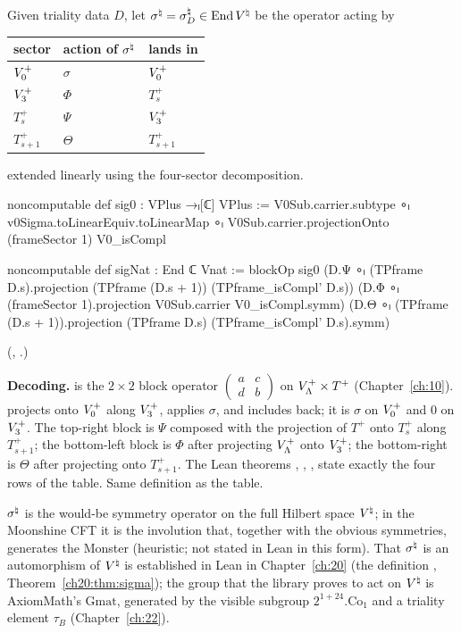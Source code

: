 \begin{definition}\label{ch14:def:signat}
Given triality data $D$, let $\sigma^{\natural}=\sigma^{\natural}_D\in\operatorname{End}{V^{\natural}}$ be the operator acting by
\begin{center}
\begin{tabular}{lll}
\toprule
sector & action of $\sigma^{\natural}$ & lands in \\ \midrule
$V_0^{+}$ & $\sigma$ & $V_0^{+}$\\
$V_3^{+}$ & $\Phi$ & $T_s^+$\\
$T_s^+$ & $\Psi$ & $V_3^{+}$\\
$T_{s+1}^+$ & $\Theta$ & $T_{s+1}^+$\\ \bottomrule
\end{tabular}
\end{center}
extended linearly using the four-sector decomposition.
\end{definition}
\begin{leancode}
noncomputable def sig0 : VPlus →ₗ[ℂ] VPlus :=
  V0Sub.carrier.subtype ∘ₗ v0Sigma.toLinearEquiv.toLinearMap ∘ₗ
    V0Sub.carrier.projectionOnto (frameSector 1) V0_isCompl

noncomputable def sigNat : End ℂ Vnat :=
  blockOp sig0
    (D.Ψ ∘ₗ (TPframe D.s).projection (TPframe (D.s + 1)) (TPframe_isCompl' D.s))
    (D.Φ ∘ₗ (frameSector 1).projection V0Sub.carrier V0_isCompl.symm)
    (D.Θ ∘ₗ (TPframe (D.s + 1)).projection (TPframe D.s) (TPframe_isCompl' D.s).symm)
\end{leancode}
(, .)

\begin{dictionary}
\textbf{Decoding.}   is the $2\times2$ block operator
$\begin{pmatrix}a&c\\d&b\end{pmatrix}$ on $V_{\Lambda}^+\times T^+$ (Chapter~\ref{ch:10}).
 projects onto $V_0^{+}$ along $V_3^{+}$, applies $\sigma$, and includes back; it is $\sigma$ on
$V_0^{+}$ and $0$ on $V_3^{+}$.  The top-right block is $\Psi$ composed with the projection of $T^+$ onto
$T_s^+$ along $T_{s+1}^+$; the bottom-left block is $\Phi$ after projecting $V_{\Lambda}^+$ onto $V_3^{+}$;
the bottom-right is $\Theta$ after projecting onto $T_{s+1}^+$.  The Lean theorems
, , ,  state exactly the four rows of the
table.  Same definition as the table.
\end{dictionary}
\begin{physics}
$\sigma^{\natural}$ is the would-be symmetry operator on the full Hilbert space ${V^{\natural}}$; in the Moonshine CFT it is the involution that, together with the obvious symmetries, generates the Monster (heuristic; not stated in Lean in this form).  That $\sigma^{\natural}$ is an automorphism of ${V^{\natural}}$ is established in Lean in Chapter~\ref{ch:20} (the definition , Theorem~\ref{ch20:thm:sigma}); the group that the library proves to act on ${V^{\natural}}$ is AxiomMath's $\mathrm{Gmat}$, generated by the visible subgroup $2^{1+24}.\mathrm{Co}_1$ and a triality element $\tau_B$ (Chapter~\ref{ch:22}).
\end{physics}


